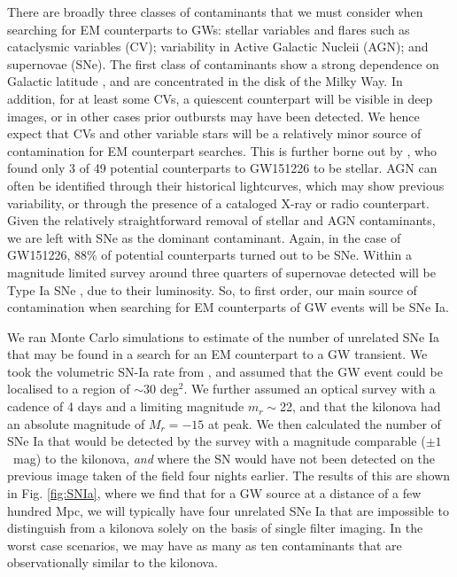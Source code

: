 \documentclass{aa}
\begin{document}
There are broadly three classes of contaminants that we must consider when searching for EM counterparts to GWs: stellar variables and flares such as cataclysmic variables (CV); variability in Active Galactic Nucleii (AGN); and supernovae (SNe). The first class of contaminants show a strong dependence on Galactic latitude \citep{Drak14}, and are concentrated in the disk of the Milky Way. In addition, for at least some CVs, a quiescent counterpart will be visible in deep images, or in other cases prior outbursts may have been detected. We hence expect that CVs and other variable stars will be a relatively minor source of contamination for EM counterpart searches. This is further borne out by \cite{Smar16}, who found only 3 of 49 potential counterparts to GW151226 to be stellar.
AGN can often be identified through their historical lightcurves, which may show previous variability, or through the presence of a cataloged X-ray or radio counterpart. Given the relatively straightforward removal of stellar and AGN contaminants, we are left with SNe as the dominant contaminant. Again, in the case of GW151226, 88\% of potential counterparts turned out to be SNe. Within a magnitude limited survey around three quarters of supernovae detected will be Type Ia SNe \citep{2011MNRAS.412.1441L}, due to their luminosity. So, to first order, our main source of contamination when searching for EM counterparts of GW events will be SNe Ia.

We ran Monte Carlo simulations to estimate of the number of unrelated SNe Ia that may be found in a search for an EM counterpart to a GW transient. We took the volumetric SN-Ia rate from \cite{2010ApJ...713.1026D}, and assumed that the GW event could be localised to a region of $\sim$30 deg$^2$. We further assumed an optical survey with a cadence of 4 days and a limiting magnitude $m_r\sim$22, and that the kilonova had an absolute magnitude of $M_r=-15$ at peak. We then calculated the number of SNe Ia that would be detected by the survey with a magnitude comparable ($\pm1$~mag) to the kilonova, {\it and} where the SN would have not been detected on the previous image taken of the field four nights earlier. The results of this are shown in Fig. \ref{fig:SNIa}, where we find that for a GW source at a distance of a few hundred Mpc, we will typically have four 
unrelated SNe Ia that are impossible to distinguish from a kilonova solely on the basis of single filter imaging. In the worst case scenarios, we may have as many as ten contaminants that are observationally similar to the kilonova.
\end{document}
